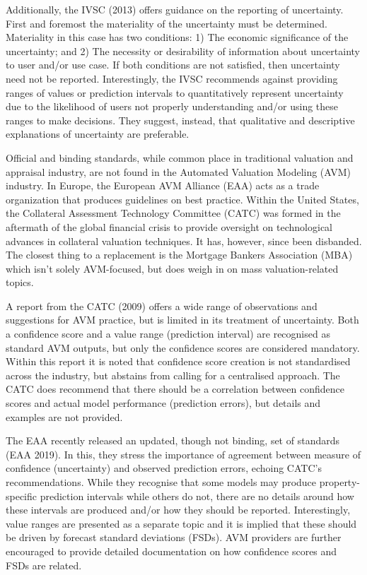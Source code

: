 \documentclass[colTwo]{format}
\theoremstyle{definition}
\begin{document}
Additionally, the IVSC (2013) offers guidance on the reporting of uncertainty.  First and foremost the materiality of the uncertainty must be determined.  Materiality in this case has two conditions: 1) The economic significance of the uncertainty; and 2) The necessity or desirability of information about uncertainty to user and/or use case.  If both conditions are not satisfied, then uncertainty need not be reported.  Interestingly, the IVSC recommends against providing ranges of values or prediction intervals to quantitatively represent uncertainty due to the likelihood of users not properly understanding and/or using these ranges to make decisions.  They suggest, instead, that qualitative and descriptive explanations of uncertainty are preferable.  

Official and binding standards, while common place in traditional valuation and appraisal industry, are not found in the Automated Valuation Modeling (AVM) industry.  In Europe, the European AVM Alliance (EAA) acts as a trade organization that produces guidelines on best practice.  Within the United States, the Collateral Assessment Technology Committee (CATC) was formed in the aftermath of the global financial crisis to provide oversight on technological advances in collateral valuation techniques. It has, however, since been disbanded.  The closest thing to a replacement is the Mortgage Bankers Association (MBA) which isn’t solely AVM-focused, but does weigh in on mass valuation-related topics.  

A report from the CATC (2009) offers a wide range of observations and suggestions for AVM practice, but is limited in its treatment of uncertainty.  Both a confidence score and a value range (prediction interval) are recognised as standard AVM outputs, but only the confidence scores are considered mandatory.  Within this report it is noted that confidence score creation is not standardised across the industry, but abstains from calling for a centralised approach.  The CATC does recommend that there should be a correlation between confidence scores and actual model performance (prediction errors), but details and examples are not provided. 

The EAA recently released an updated, though not binding, set of standards (EAA 2019). In this, they stress the importance of agreement between measure of confidence (uncertainty) and observed prediction errors, echoing CATC’s recommendations.  While they recognise that some models may produce property-specific prediction intervals while others do not, there are no details around how these intervals are produced and/or how they should be reported.  Interestingly, value ranges are presented as a separate topic and it is implied that these should be driven by forecast standard deviations (FSDs).  AVM providers are further encouraged to provide detailed documentation on how confidence scores and FSDs are related.  
\end{document}
